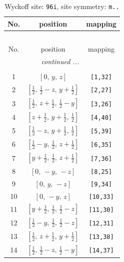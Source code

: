\documentclass[fleqn,8pt]{jsarticle}
\begin{document}
\begin{longtable}{ccc}
\caption{Wyckoff site: {\tt 96i}, site symmetry: {\tt m..}}
 \\
 \hline \hline
No. & position & mapping \\ \hline \endfirsthead

\multicolumn{2}{l}{\tablename\ \thetable{}} \\
 \hline \hline
No. & position & mapping \\ \hline \endhead

 \hline \hline
\multicolumn{2}{r}{\footnotesize\it continued ...} \\ \endfoot

 \hline \hline
\multicolumn{2}{r}{} \\ \endlastfoot

1 & $\left[ 0,\, y,\, z \right]$ & {\tt [1,32]} \\ \hline
2 & $\left[ \frac{1}{2},\, \frac{1}{2} - z,\, y + \frac{1}{2} \right]$ & {\tt [2,27]} \\ \hline
3 & $\left[ \frac{1}{2},\, z + \frac{1}{2},\, \frac{1}{2} - y \right]$ & {\tt [3,26]} \\ \hline
4 & $\left[ z + \frac{1}{2},\, y + \frac{1}{2},\, \frac{1}{2} \right]$ & {\tt [4,40]} \\ \hline
5 & $\left[ \frac{1}{2} - z,\, y + \frac{1}{2},\, \frac{1}{2} \right]$ & {\tt [5,39]} \\ \hline
6 & $\left[ \frac{1}{2} - y,\, \frac{1}{2},\, z + \frac{1}{2} \right]$ & {\tt [6,35]} \\ \hline
7 & $\left[ y + \frac{1}{2},\, \frac{1}{2},\, z + \frac{1}{2} \right]$ & {\tt [7,36]} \\ \hline
8 & $\left[ 0,\, - y,\, - z \right]$ & {\tt [8,25]} \\ \hline
9 & $\left[ 0,\, y,\, - z \right]$ & {\tt [9,34]} \\ \hline
10 & $\left[ 0,\, - y,\, z \right]$ & {\tt [10,33]} \\ \hline
11 & $\left[ y + \frac{1}{2},\, \frac{1}{2},\, \frac{1}{2} - z \right]$ & {\tt [11,30]} \\ \hline
12 & $\left[ \frac{1}{2} - y,\, \frac{1}{2},\, \frac{1}{2} - z \right]$ & {\tt [12,31]} \\ \hline
13 & $\left[ \frac{1}{2},\, z + \frac{1}{2},\, y + \frac{1}{2} \right]$ & {\tt [13,38]} \\ \hline
14 & $\left[ \frac{1}{2},\, \frac{1}{2} - z,\, \frac{1}{2} - y \right]$ & {\tt [14,37]} \\ \hline

\end{longtable}
\end{document}
